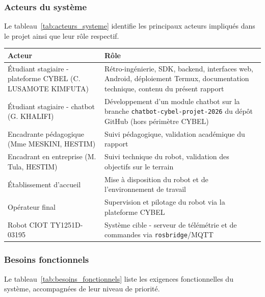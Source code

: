 \newpage
\subsubsection{Acteurs du système}

Le tableau~\ref{tab:acteurs_systeme} identifie les principaux acteurs
impliqués dans le projet ainsi que leur rôle respectif.

\begin{center}
\begin{tabular}{|p{}|p{}|}
\hline
\textbf{Acteur} & \textbf{Rôle} \\
\hline
Étudiant stagiaire - plateforme CYBEL (C. LUSAMOTE KIMFUTA) &
Rétro-ingénierie, SDK, backend, interfaces web, Android, déploiement Termux,
documentation technique, contenu du présent rapport \\
\hline
Étudiant stagiaire - chatbot (G. KHALIFI) &
Développement d'un module chatbot sur la branche
\texttt{chatbot-cybel-projet-2026} du dépôt GitHub (hors périmètre CYBEL) \\
\hline
Encadrante pédagogique (Mme MESKINI, HESTIM) &
Suivi pédagogique, validation académique du rapport \\
\hline
Encadrant en entreprise (M. Tula, HESTIM) &
Suivi technique du robot, validation des objectifs sur le terrain \\
\hline
Établissement d'accueil &
Mise à disposition du robot et de l'environnement de travail \\
\hline
Opérateur final &
Supervision et pilotage du robot via la plateforme CYBEL \\
\hline
Robot CIOT TY1251D-03195 &
Système cible - serveur de télémétrie et de commandes via \texttt{rosbridge}/MQTT \\
\hline
\end{tabular}
\label{tab:acteurs_systeme}
\end{center}

\subsubsection{Besoins fonctionnels}

Le tableau~\ref{tab:besoins_fonctionnels} liste les exigences fonctionnelles
du système, accompagnées de leur niveau de priorité.

